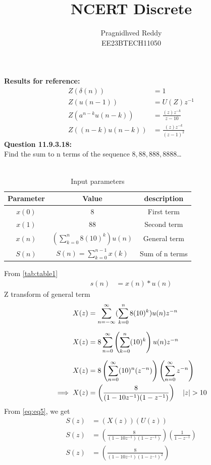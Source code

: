 \documentclass[journal,12pt,twocolumn]{IEEEtran}
\title{NCERT Discrete}
\author{Pragnidhved Reddy\\EE23BTECH11050}
\date{}
\begin{document}
\maketitle
\newpage
\bigskip
\textbf{Results for reference:}\\
\begin{align}
\label{eq:eq1}
Z(\delta (n)) &=1\\
\label{eq:eq2}
Z(u(n-1))&=U(Z)z^{-1}\\
\label{eq:eq3}
Z(a^{n-k}u(n-k))&=\frac{(z)z^{-k}}{z-10}\\
\label{eq:eq4}
Z((n-k)u(n-k))&=\frac{(z)z^{-k}}{(z-1)^2}
\end{align}
\textbf{Question 11.9.3.18:}\\
 Find the sum to n terms of the sequence $8,88,888,8888$\ldots\\
 \solution \\
 \begin{table}[H]
\centering
\setlength{\extrarowheight}{8pt}
\begin{tabular}{|c|c|c|}\hline
\textbf{Parameter} & \textbf{Value} & \textbf{description}\\ \hline
$x(0)$ & 8 & First term \\ \hline
$x(1)$ & 88 & Second term \\ \hline 
$x(n)$ & $(\sum^{n}_{k=0}8(10)^k)u(n)$ & General term \\ \hline
$S(n)$ & $S(n)=\sum^{n-1}_{k=0}x(k)$ & Sum of n terms \\ \hline
\end{tabular}
\caption{Input parameters}
\label{tab:table1}
\end{table}
 From \eqref{tab:table1}
\begin{align}
\label{eq:eq5}
 s(n)&=x(n)* u(n)
 \end{align}
 Z transform of general term
 \begin{align}
 X(z)&=\sum_{n=-\infty}^{\infty}(\sum_{k=0}^{n}8(10)^k)u(n)z^{-n}\\[6pt]
 X(z)&=8\sum_{n=0}^{\infty}\left(\sum_{k=0}^{n}(10)^k\right)u(n)z^{-n}\\[6pt]
 X(z)&=8\left(\sum_{n=0}^{\infty}(10)^n(z^{-n})\right)\left(\sum_{n=0}^{\infty}z^{-n}\right)\\
 \implies X(z)&=\left(\frac{8}{(1-10z^{-1})(1-z^{-1})}\right) \quad \left\vert z\right\vert>10
\end{align}
From \eqref{eq:eq5}, we get
 \begin{align}
 S(z)&=(X(z))(U(z))\\
 S(z)&=\left(\frac{8}{(1-10z^{-1})(1-z^{-1})}\right)\left(\frac{1}{1-z^{-1}}\right)\\[6pt]
 S(z)&=\left(\frac{8}{(1-10z^{-1})(1-z^{-1})^2}\right)
\end{align}
\end{document}

